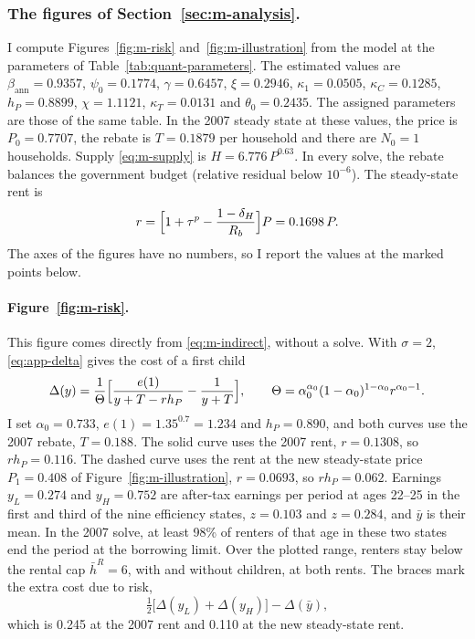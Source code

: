 \subsubsection*{The figures of Section~\ref{sec:m-analysis}.}
\label{app:model-figures}
I compute Figures~\ref{fig:m-risk} and~\ref{fig:m-illustration} from the model at the parameters of
Table~\ref{tab:quant-parameters}. The estimated values are
$\beta_{\text{ann}}=0.9357$, $\psi_0=0.1774$, $\gamma=0.6457$, $\xi=0.2946$,
$\kappa_1=0.0505$, $\kappa_C=0.1285$, $h_P=0.8899$, $\chi=1.1121$,
$\kappa_T=0.0131$ and $\theta_0=0.2435$. The assigned parameters are those of
the same table. In the 2007 steady state at these values, the price
is $P_0=0.7707$, the rebate is $T=0.1879$ per household and there are $N_0=1$
households. Supply \eqref{eq:m-supply} is $H=6.776\,P^{0.63}$. In every solve,
the rebate balances the government budget (relative residual below $10^{-6}$).
The steady-state rent is
\[
 r=\Bigl[1+\tau^p-\frac{1-\delta_H}{R_b}\Bigr]P=0.1698\,P .
\]
The axes of the figures have no numbers, so I report the values at the
marked points below.

\paragraph{Figure~\ref{fig:m-risk}.} This figure comes directly from
\eqref{eq:m-indirect}, without a solve. With $\sigma=2$, \eqref{eq:app-delta}
gives the cost of a first child
\[
 \Delta(y)=\frac{1}{\Theta}\Bigl[\frac{e(1)}{y+T-rh_P}-\frac{1}{y+T}\Bigr],
 \qquad
 \Theta=\alpha_0^{\alpha_0}(1-\alpha_0)^{1-\alpha_0}r^{\alpha_0-1}.
\]
I set $\alpha_0=0.733$, $e(1)=1.35^{0.7}=1.234$ and $h_P=0.890$, and both
curves use the 2007 rebate, $T=0.188$. The solid curve uses the 2007 rent,
$r=0.1308$, so $rh_P=0.116$. The dashed curve uses the rent at the new
steady-state price $P_1=0.408$ of Figure~\ref{fig:m-illustration},
$r=0.0693$, so $rh_P=0.062$. Earnings $y_L=0.274$ and $y_H=0.752$ are
after-tax earnings per period at ages 22--25 in the first and third of the
nine efficiency states, $z=0.103$ and $z=0.284$, and $\bar y$ is their mean.
In the 2007 solve, at least 98\% of renters of that age in these two states
end the period at the borrowing limit. Over the plotted range, renters stay
below the rental cap $\bar h^R=6$, with and without children, at both rents.
The braces mark the extra cost due to risk,
\[
 \tfrac12\bigl[\Delta(y_L)+\Delta(y_H)\bigr]-\Delta(\bar y),
\]
which is 0.245 at the 2007 rent and 0.110 at the new steady-state rent.


